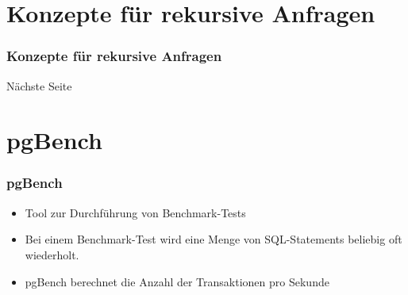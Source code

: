 \documentclass[hyperref={pdfpagelabels=false}]{beamer}
\newcommand{\storedproc}{Stored Procedure}
\newcommand{\pgbench}{pgBench}
\newcommand{\konzepte}{Konzepte für rekursive Anfragen}
\begin{document}
\section{Konzepte für rekursive Anfragen}
\begin{frame}
    \frametitle{\konzepte}
        \center
            Nächste Seite

\end{frame}

    {
    
    }

%

\section{pgBench}
\begin{frame}
    \frametitle{\pgbench}
    \begin{itemize}
        \item Tool zur Durchführung von Benchmark-Tests
        \item Bei einem Benchmark-Test wird eine Menge von SQL-Statements beliebig oft wiederholt.
        \item pgBench berechnet die Anzahl der Transaktionen pro Sekunde
    \end{itemize}
\end{frame}
\end{document}
